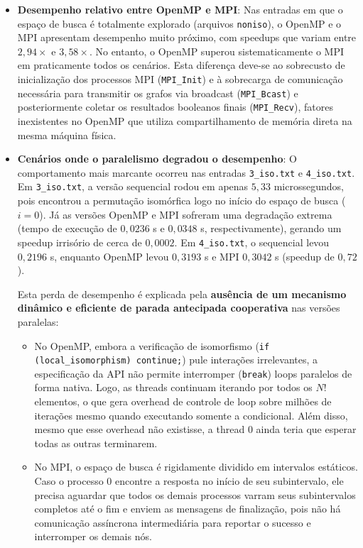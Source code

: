 \documentclass[12pt,a4paper]{article}
\begin{document}
\begin{itemize}
    \item \textbf{Desempenho relativo entre OpenMP e MPI}:
    Nas entradas em que o espaço de busca é totalmente explorado (arquivos \texttt{noniso}),
    o OpenMP e o MPI apresentam desempenho muito próximo,
    com speedups que variam entre $2,94\times$ e $3,58\times$.
    No entanto, o OpenMP superou sistematicamente o MPI em praticamente todos os cenários.
    Esta diferença deve-se ao sobrecusto de inicialização dos processos MPI (\texttt{MPI\_Init}) e à sobrecarga de comunicação necessária para transmitir os grafos via broadcast (\texttt{MPI\_Bcast}) e posteriormente coletar os resultados booleanos finais (\texttt{MPI\_Recv}),
    fatores inexistentes no OpenMP que utiliza compartilhamento de memória direta na mesma máquina física.

    \item \textbf{Cenários onde o paralelismo degradou o desempenho}:
    O comportamento mais marcante ocorreu nas entradas \texttt{3\_iso.txt} e \texttt{4\_iso.txt}.
    Em \texttt{3\_iso.txt},
    a versão sequencial rodou em apenas $5,33$ microssegundos,
    pois encontrou a permutação isomórfica logo no início do espaço de busca ($i=0$).
    Já as versões OpenMP e MPI sofreram uma degradação extrema (tempo de execução de $0,0236$ s e $0,0348$ s, respectivamente),
    gerando um speedup irrisório de cerca de $0,0002$.
    Em \texttt{4\_iso.txt}, o sequencial levou $0,2196$ s,
    enquanto OpenMP levou $0,3193$ s e MPI $0,3042$ s (speedup de $0,72$).

    Esta perda de desempenho é explicada pela \textbf{ausência de um mecanismo dinâmico e eficiente de parada antecipada cooperativa} nas versões paralelas:
    \begin{itemize}
        \item No OpenMP,
        embora a verificação de isomorfismo (\texttt{if (local\_isomorphism) continue;}) pule interações irrelevantes,
        a especificação da API não permite interromper (\texttt{break}) loops paralelos de forma nativa.
        Logo, as threads continuam iterando por todos os $N!$ elementos,
        o que gera overhead de controle de loop sobre milhões de iterações mesmo quando executando somente a condicional.
        Além disso,
        mesmo que esse overhead não existisse,
        a thread 0 ainda teria que esperar todas as outras terminarem.
        \item No MPI,
        o espaço de busca é rigidamente dividido em intervalos estáticos.
        Caso o processo 0 encontre a resposta no início de seu subintervalo,
        ele precisa aguardar que todos os demais processos varram seus subintervalos completos até o fim e enviem as mensagens de finalização,
        pois não há comunicação assíncrona intermediária para reportar o sucesso e interromper os demais nós.
    \end{itemize}


\end{itemize}
\end{document}

